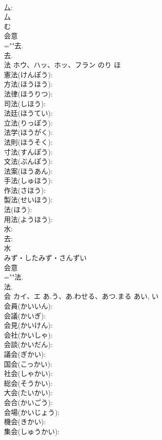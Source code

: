 \documentclass[8pt]{extreport}
\begin{document}
\begin{CJK}{UTF8}{min}
\\	厶: 
\\	厶	
\\	む	
\\	会意 
\\	=""去.
\\	去.
\\	法	ホウ、ハッ、ホッ、フラン	のり	ほ	
\\	憲法(けんぽう): 
\\	方法(ほうほう): 
\\	法律(ほうりつ): 
\\	司法(しほう): 
\\	法廷(ほうてい): 
\\	立法(りっぽう): 
\\	法学(ほうがく): 
\\	法則(ほうそく): 
\\	寸法(すんぽう): 
\\	文法(ぶんぽう): 
\\	法案(ほうあん): 
\\	手法(しゅほう): 
\\	作法(さほう): 
\\	製法(せいほう): 
\\	法(ほう): 
\\	用法(ようほう): 
\\	水: 
\\	去: 
\\	水	
\\	みず・したみず・さんずい	
\\	会意 
\\	=""法.
\\	法.
\\	会	カイ、エ	あ.う、あ.わせる、あつ.まる	あい, い	
\\	会員(かいいん): 
\\	会議(かいぎ): 
\\	会見(かいけん): 
\\	会社(かいしゃ): 
\\	会談(かいだん): 
\\	議会(ぎかい): 
\\	国会(こっかい): 
\\	社会(しゃかい): 
\\	総会(そうかい): 
\\	大会(たいかい): 
\\	会合(かいごう): 
\\	会場(かいじょう): 
\\	機会(きかい): 
\\	集会(しゅうかい): 

\end{CJK}
\end{document}
